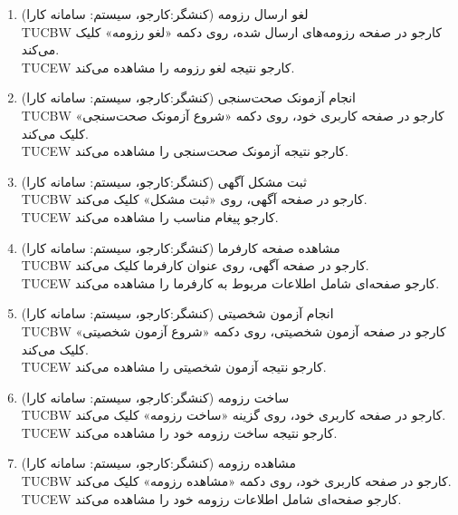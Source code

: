 \documentclass[12pt]{article}
\begin{document}
\begin{enumerate}
		\item
		لغو ارسال رزومه  (کنشگر:‌کارجو، سیستم: سامانه کارا)\\
		TUCBW کارجو در صفحه رزومه‌های ارسال شده، روی دکمه «لغو رزومه» کلیک می‌کند.\\
		TUCEW کارجو نتیجه‌ لغو رزومه را مشاهده می‌کند.\\

		\item
		انجام آزمونک‌ صحت‌سنجی (کنشگر:‌کارجو، سیستم: سامانه کارا)\\
		TUCBW کارجو در صفحه کاربری خود، روی دکمه «شروع آزمونک صحت‌سنجی» کلیک می‌کند.\\
		TUCEW کارجو نتیجه‌ آزمونک صحت‌سنجی را مشاهده می‌کند.\\


		\item
		ثبت مشکل آگهی (کنشگر:‌کارجو، سیستم: سامانه کارا)\faStar\\
		TUCBW کارجو در صفحه آگهی، روی «ثبت مشکل» کلیک می‌کند.\\
		TUCEW کارجو پیغام مناسب را مشاهده می‌کند.\\

		\item
		مشاهده صفحه کارفرما (کنشگر:‌کارجو، سیستم: سامانه کارا)\\
		TUCBW کارجو در صفحه آگهی، روی عنوان کارفرما کلیک می‌کند.\\
		TUCEW کارجو صفحه‌ای شامل اطلاعات مربوط به کارفرما را مشاهده می‌کند.\\

		\item
		انجام آزمون‌ شخصیتی (کنشگر:‌کارجو، سیستم: سامانه کارا)\\
		TUCBW کارجو در صفحه آزمون شخصیتی، روی دکمه «شروع آزمون شخصیتی» کلیک می‌کند.\\
		TUCEW کارجو نتیجه‌ آزمون شخصیتی را مشاهده می‌کند.\\

		\item
		ساخت رزومه (کنشگر:‌کارجو، سیستم: سامانه کارا)\faStar\\
		TUCBW کارجو در صفحه کاربری خود، روی گزینه «ساخت رزومه» کلیک می‌کند.\\
		TUCEW کارجو نتیجه ساخت رزومه خود را مشاهده می‌کند.\\

		\item
		مشاهده رزومه (کنشگر:‌کارجو، سیستم: سامانه کارا)\\
		TUCBW کارجو در صفحه کاربری خود، روی دکمه «مشاهده رزومه» کلیک می‌کند.\\
		TUCEW کارجو صفحه‌ای شامل اطلاعات رزومه خود را مشاهده می‌کند.\\


\end{enumerate}
\end{document}
